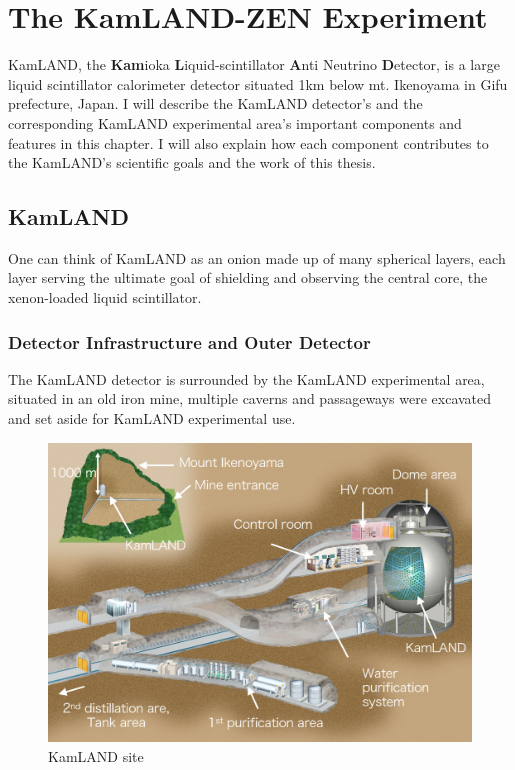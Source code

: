 \chapter{The KamLAND-ZEN Experiment}
\label{chapter:klz-detector}
\thispagestyle{myheadings}
\graphicspath{{2_Chapter_KLZ_Detector/Figures/}}

KamLAND, the \textbf{Kam}ioka \textbf{L}iquid-scintillator \textbf{A}nti Neutrino \textbf{D}etector, is a large liquid scintillator calorimeter detector situated 1km below mt. Ikenoyama in Gifu prefecture, Japan. I will describe the KamLAND detector's and the corresponding KamLAND experimental area's important components and features in this chapter. I will also explain how each component contributes to the KamLAND's scientific goals and the work of this thesis.


\section{KamLAND}
\label{sec:KamLAND}
One can think of KamLAND as an onion made up of many spherical layers, each layer serving the ultimate goal of shielding and observing the central core, the xenon-loaded liquid scintillator.

\subsection{Detector Infrastructure and Outer Detector}
The KamLAND detector is surrounded by the KamLAND experimental area, situated in an old iron mine, multiple caverns and passageways were excavated and set aside for KamLAND experimental use.

\begin{figure}[htb]
	\centering
	\includegraphics[scale=0.4]{KamLAND_site.png}
	\caption{KamLAND site}
	\label{fig:kamlandsite}
\end{figure}


